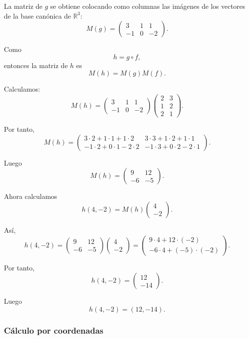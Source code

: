 \documentclass[12pt]{article}
\begin{document}
La matriz de \(g\) se obtiene colocando como columnas las imágenes de los vectores de la base canónica de \(\mathbb{R}^3\):
\[
M(g)=
\begin{pmatrix}
3&1&1\\
-1&0&-2
\end{pmatrix}.
\]

Como
\[
h=g\circ f,
\]
entonces la matriz de \(h\) es
\[
M(h)=M(g)M(f).
\]

Calculamos:
\[
M(h)=
\begin{pmatrix}
3&1&1\\
-1&0&-2
\end{pmatrix}
\begin{pmatrix}
2&3\\
1&2\\
2&1
\end{pmatrix}.
\]

Por tanto,
\[
M(h)=
\begin{pmatrix}
3\cdot 2+1\cdot 1+1\cdot 2 & 3\cdot 3+1\cdot 2+1\cdot 1\\
-1\cdot 2+0\cdot 1-2\cdot 2 & -1\cdot 3+0\cdot 2-2\cdot 1
\end{pmatrix}.
\]

Luego
\[
M(h)=
\begin{pmatrix}
9&12\\
-6&-5
\end{pmatrix}.
\]

Ahora calculamos
\[
h(4,-2)=M(h)
\begin{pmatrix}
4\\
-2
\end{pmatrix}.
\]

Así,
\[
h(4,-2)=
\begin{pmatrix}
9&12\\
-6&-5
\end{pmatrix}
\begin{pmatrix}
4\\
-2
\end{pmatrix}
=
\begin{pmatrix}
9\cdot 4+12\cdot(-2)\\
-6\cdot 4+(-5)\cdot(-2)
\end{pmatrix}.
\]

Por tanto,
\[
h(4,-2)=
\begin{pmatrix}
12\\
-14
\end{pmatrix}.
\]

Luego
\[
\boxed{h(4,-2)=(12,-14).}
\]

\subsubsection*{Cálculo por coordenadas}
\end{document}
